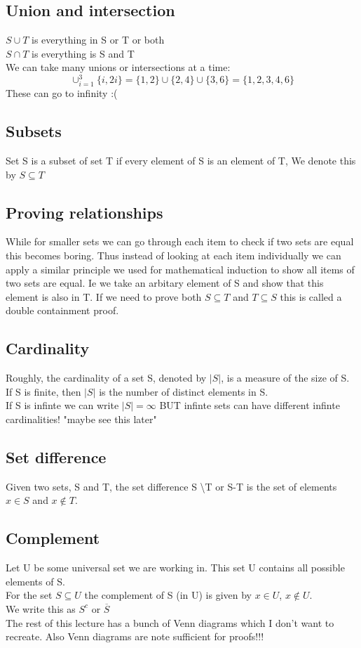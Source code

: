 \documentclass[a4paper, 11pt]{report}
\begin{document}
	\subsection{Union and intersection}
	\(S \cup T\) is everything in S or T or both\\
	\(S \cap T\) is everything is S and T \\
	We can take many unions or intersections at a time:
	\[\cup^{3}_{i=1} \{i, 2i\} = \{1, 2\} \cup \{2, 4\} \cup \{3, 6\} = \{1, 2, 3, 4, 6\}\]
	These can go to infinity :(
	\subsection{Subsets}
	Set S is a subset of set T if every element of S is an element of T, We denote this by \(S \subseteq T\)
	\subsection{Proving relationships}
	While for smaller sets we can go through each item to check if two sets are equal this becomes boring. Thus instead of looking at each item individually we can apply a similar principle we used for mathematical induction to show all items of two sets are equal. Ie we take an arbitary element of S and show that this element is also in T. If we need to prove both \(S \subseteq T\) and \(T \subseteq S\) this is called a double containment proof.
	\subsection{Cardinality}
	Roughly, the cardinality of a set S, denoted by \(|S|\), is a measure of the size of S. \\
	If S is finite, then \(|S|\) is the number of distinct elements in S. \\
	If S is infinte we can write \(|S| = \infty\) BUT infinte sets can have different infinte cardinalities! "maybe see this later"\\
	\subsection{Set difference}
	Given two sets, S and T, the set difference S \textbackslash T or S-T is the set of elements \(x \in S\) and \(x \notin T\).
	\subsection{Complement}
	Let U be some universal set we are working in. This set U contains all possible elements of S.\\
	For the set \(S \subseteq U\) the complement of S (in U) is given by \(x \in U\), \(x \notin U\).\\
	We write this as \(S^{c}\) or \(\overline{S}\) \\
	The rest of this lecture has a bunch of Venn diagrams which I don't want to recreate. Also Venn diagrams are note sufficient for proofs!!!
\end{document}
